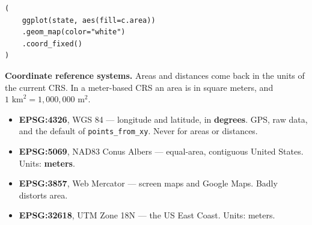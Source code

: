 \documentclass[11pt, a4paper]{article}
\newcommand{\code}[1]{\texttt{#1}}
\begin{document}
\begin{verbatim}
(
    ggplot(state, aes(fill=c.area))
    .geom_map(color="white")
    .coord_fixed()
)
\end{verbatim}

\smallskip

\textbf{Coordinate reference systems.}
Areas and distances come back in the units of the current CRS. In a meter-based CRS an area
is in square meters, and $1 \textrm{ km}^2 = 1{,}000{,}000 \textrm{ m}^2$.

\smallskip

\sloppy
\begin{itemize}
  \item \textbf{EPSG:4326}, WGS 84 --- longitude and latitude, in \textbf{degrees}. GPS,
        raw data, and the default of \code{points\_from\_xy}. Never for areas or distances.
  \item \textbf{EPSG:5069}, NAD83 Conus Albers --- equal-area, contiguous United States.
        Units: \textbf{meters}.
  \item \textbf{EPSG:3857}, Web Mercator --- screen maps and Google Maps. Badly distorts
        area.
  \item \textbf{EPSG:32618}, UTM Zone 18N --- the US East Coast. Units: meters.
\end{itemize}
\fussy
\end{document}
